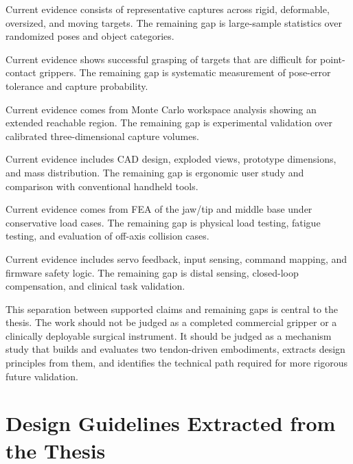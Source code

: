 \begin{description}[style=nextline,leftmargin=1.5em,labelindent=0pt,itemsep=0.8em]
    \item[\textbf{Lasso capture feasibility.}]
    Current evidence consists of representative captures across rigid, deformable, oversized, and moving targets. The remaining gap is large-sample statistics over randomized poses and object categories.

    \item[\textbf{Loop-based object tolerance.}]
    Current evidence shows successful grasping of targets that are difficult for point-contact grippers. The remaining gap is systematic measurement of pose-error tolerance and capture probability.

    \item[\textbf{Workspace extension.}]
    Current evidence comes from Monte Carlo workspace analysis showing an extended reachable region. The remaining gap is experimental validation over calibrated three-dimensional capture volumes.

    \item[\textbf{Surgical instrument packaging.}]
    Current evidence includes CAD design, exploded views, prototype dimensions, and mass distribution. The remaining gap is ergonomic user study and comparison with conventional handheld tools.

    \item[\textbf{Structural strength.}]
    Current evidence comes from FEA of the jaw/tip and middle base under conservative load cases. The remaining gap is physical load testing, fatigue testing, and evaluation of off-axis collision cases.

    \item[\textbf{Control implementation.}]
    Current evidence includes servo feedback, input sensing, command mapping, and firmware safety logic. The remaining gap is distal sensing, closed-loop compensation, and clinical task validation.
\end{description}

This separation between supported claims and remaining gaps is central to the thesis. The work should not be judged as a completed commercial gripper or a clinically deployable surgical instrument. It should be judged as a mechanism study that builds and evaluates two tendon-driven embodiments, extracts design principles from them, and identifies the technical path required for more rigorous future validation.

\section{Design Guidelines Extracted from the Thesis}

